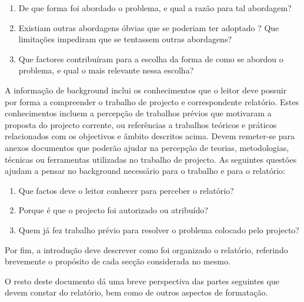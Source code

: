 \begin{enumerate}
 \item De que forma foi abordado o problema, e qual a razão para tal abordagem?
 \item Existiam outras abordagens óbvias que se poderiam ter adoptado ? Que limitações impediram que se tentassem outras abordagens?
 \item Que factores contribuíram para a escolha da forma de como se abordou o problema, e qual o mais relevante nessa escolha?
\end{enumerate}

A informação de background inclui os conhecimentos que o leitor deve possuir por forma a compreender o trabalho de projecto e correspondente relatório. Estes conhecimentos incluem a percepção de trabalhos prévios que motivaram a proposta do projecto corrente, ou referências a trabalhos teóricos e práticos relacionados com os objectivos e âmbito descritos acima. Devem remeter-se para anexos documentos que poderão ajudar na percepção de teorias, metodologias, técnicas ou ferramentas utilizadas no trabalho de projecto. As seguintes questões ajudam a pensar no background necessário para o trabalho e para o relatório:

\begin{enumerate}
 \item Que factos deve o leitor conhecer para perceber o relatório?
 \item Porque é que o projecto foi autorizado ou atribuído?
 \item Quem já fez trabalho prévio para resolver o problema colocado pelo projecto?
\end{enumerate}

Por fim, a introdução deve descrever como foi organizado o relatório, referindo brevemente o propósito de cada secção considerada no mesmo.

O resto deste documento dá uma breve perspectiva das partes seguintes que devem constar do relatório, bem como de outros aspectos de formatação.